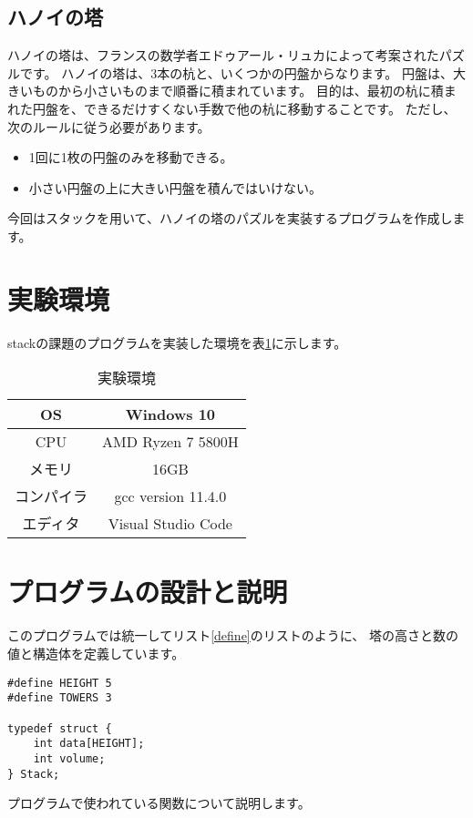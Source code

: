 \documentclass[a4j]{jarticle}
\begin{document}
\subsection{ハノイの塔}
ハノイの塔は、フランスの数学者エドゥアール・リュカによって考案されたパズルです。
ハノイの塔は、3本の杭と、いくつかの円盤からなります。
円盤は、大きいものから小さいものまで順番に積まれています。
目的は、最初の杭に積まれた円盤を、できるだけすくない手数で他の杭に移動することです。
ただし、次のルールに従う必要があります。
\begin{itemize}
  \item 1回に1枚の円盤のみを移動できる。
  \item 小さい円盤の上に大きい円盤を積んではいけない。
\end{itemize}
今回はスタックを用いて、ハノイの塔のパズルを実装するプログラムを作成します。

\section{実験環境}
stackの課題のプログラムを実装した環境を表\ref{tb:environment}に示します。
\begin{table}[h]
  \centering
  \caption{実験環境}
  \label{tb:environment}
  \begin{tabular}{|c|c|}
    \hline
    OS    & Windows 10         \\
    \hline
    CPU   & AMD Ryzen 7 5800H  \\
    \hline
    メモリ   & 16GB               \\
    \hline
    コンパイラ & gcc version 11.4.0 \\
    \hline
    エディタ  & Visual Studio Code \\
    \hline
  \end{tabular}
\end{table}

\section{プログラムの設計と説明}
このプログラムでは統一してリスト\ref{define}のリストのように、
塔の高さと数の値と構造体を定義しています。
\begin{lstlisting}[caption=値と構造体の定義,label=define]
#define HEIGHT 5
#define TOWERS 3

typedef struct {
    int data[HEIGHT];
    int volume;
} Stack;
  \end{lstlisting}

プログラムで使われている関数について説明します。
\end{document}

